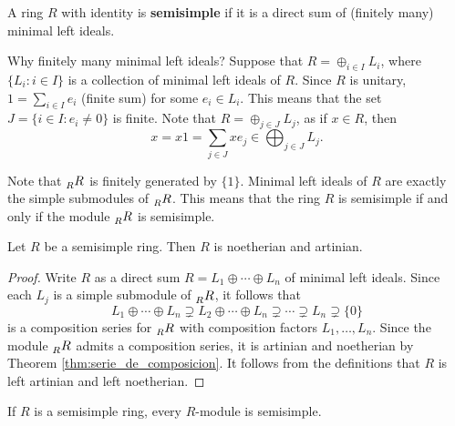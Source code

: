 \begin{definition}
    A ring $R$ with identity is \textbf{semisimple} if it is a direct sum of (finitely many) 
    minimal left ideals. 
\end{definition}

Why finitely many minimal left ideals?
Suppose that $R=\oplus_{i\in I}L_i$, where $\{L_i:i\in I\}$ is a collection of
minimal left ideals of $R$. 
Since $R$ is unitary, $1=\sum_{i\in I}e_i$ (finite sum) for 
some $e_i\in L_i$. This means that the set $J=\{i\in I:e_i\ne 0\}$ is finite.
Note that $R=\oplus_{j\in J}L_j$, as 
if $x\in R$, then 
\[
x=x1=\sum_{j\in J}xe_j\in \bigoplus_{j\in J}L_j.
\]

Note
that $\prescript{}{R}{R}$ is finitely generated by $\{1\}$. Minimal left ideals of $R$ 
are exactly the simple submodules of $\prescript{}{R}{R}$. 
This means that 
the ring $R$ is semisimple if and only if the module
$\prescript{}{R}{R}$ is semisimple.  

\begin{proposition}
    Let $R$ be a semisimple ring. Then $R$ is noetherian and artinian.
\end{proposition}

\begin{proof}
    Write $R$ as a direct sum $R=L_1\oplus\cdots\oplus L_n$ of minimal left ideals. Since 
    each $L_j$ is a simple submodule of $\prescript{}{R}{R}$, it follows that 
    \[
    L_1\oplus\cdots\oplus L_n\supsetneq L_2\oplus\cdots\oplus L_n\supsetneq\cdots\supsetneq L_n\supsetneq\{0\}
    \]
    is a composition series for $\prescript{}{R}{R}$ with composition factors
    $L_1,\dots,L_n$. Since the module $\prescript{}{R}{R}$ admits a composition
    series, it is artinian and noetherian by Theorem \ref{thm:serie_de_composicion}. It follows
    from the definitions that $R$ is left artinian and left noetherian. 
\end{proof}

\begin{exercise}
\label{xca:semisimple}
    If $R$ is a semisimple ring, every $R$-module is semisimple. 
\end{exercise}


